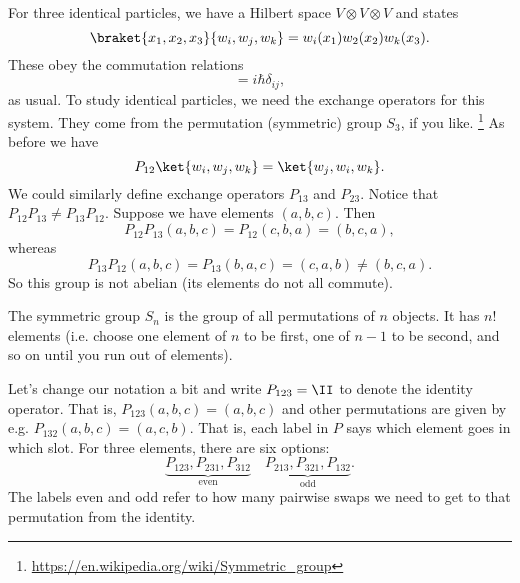For three identical particles, we have a Hilbert space $V\otimes V \otimes V$ and states
\begin{equation}
    \braket{x_1,x_2,x_3}{w_i,w_j,w_k} = w_i(x_1)w_2(x_2)w_k(x_3).
\end{equation}
These obey the commutation relations
\begin{equation}
    [\hat x_i, \hat p_j] = i\hbar \delta_{ij},
\end{equation}
as usual.
To study identical particles, we need the exchange operators for this system. They come from the permutation (symmetric) group $S_3$, if you like.%
    \footnote{\url{https://en.wikipedia.org/wiki/Symmetric_group}}
As before we have
\begin{equation}
    P_{12}\ket{w_i,w_j,w_k} = \ket{w_j,w_i,w_k}.
\end{equation}
We could similarly define exchange operators $P_{13}$ and $P_{23}$. Notice that $P_{12} P_{13} \neq P_{13}  P_{12}$. Suppose we have elements $(a,b,c)$. Then 
\begin{equation}
    P_{12}P_{13}(a,b,c)= P_{12}(c,b,a) = (b,c,a),
\end{equation}
whereas
\begin{equation}
    P_{13}P_{12}(a,b,c) = P_{13}(b,a,c) = (c,a,b) \neq (b,c,a).
\end{equation}
So this group is not abelian (its elements do not all commute).

The symmetric group $S_n$ is the group of all permutations of $n$ objects. It has $n!$ elements (i.e. choose one element of $n$ to be first, one of $n-1$ to be second, and so on until you run out of elements).

Let's change our notation a bit and write $P_{123} = \II$ to denote the identity operator. That is, $P_{123}(a,b,c) = (a,b,c)$ and other permutations are given by e.g. $P_{132}(a,b,c) = (a,c,b)$. That is, each label in $P$ says which element goes in which slot. For three elements, there are six options:
\begin{equation}
    \underbrace{P_{123},P_{231},P_{312}}_\text{even}\quad\underbrace{ P_{213},P_{321},P_{132}}_\text{odd}.
\end{equation}
The labels even and odd refer to how many pairwise swaps we need to get to that permutation from the identity.


